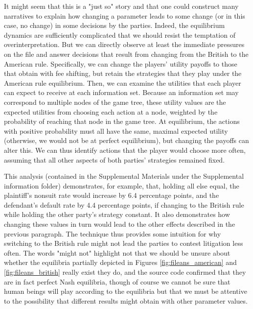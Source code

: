 \documentclass{article}
\begin{document}
It might seem that this is a "just so" story and that one could construct many narratives to explain how changing a parameter leads to some change (or in this case, no change) in some decisions by the parties. Indeed, the equilibrium dynamics are sufficiently complicated that we should resist the temptation of overinterpretation. But  we can directly observe at least the immediate pressures on the file and answer decisions that result from changing from the British to the American rule. Specifically, we can change the players' utility payoffs to those that obtain with fee shifting, but retain the strategies that they play under the American rule equilibrium. Then, we can examine the utilities that each player can expect to receive at each information set. Because an information set may correspond to multiple nodes of the game tree, these utility values are the expected utilities from choosing each action at a node, weighted by the probability of reaching that node in the game tree. At equilibrium, the actions with positive probability must all have the same, maximal expected utility (otherwise, we would not be at perfect equilibrium), but changing the payoffs can alter this. We can thus identify actions that the player would choose more often, assuming that all other aspects of both parties' strategies remained fixed. 

This analysis (contained in the Supplemental Materials under the Supplemental information folder) demonstrates, for example, that, holding all else equal, the plaintiff's nonsuit rate would increase by 6.4 percentage points, and the defendant's default rate by 4.4 percentage points, if changing to the British rule while holding the other party's strategy constant. It also demonstrates how changing these values in turn would lead to the other effects described in the previous paragraph. The technique thus provides some intuition for why switching to the British rule might not lead the parties to contest litigation less often. The words "might not" highlight not that we should be unsure about whether the equilibria partially depicted in Figures \ref{fig:fileans_american} and \ref{fig:fileans_british} really exist \textemdash they do, and the source code confirmed that they are in fact perfect Nash equilibria, though of course we cannot be sure that human beings will play according to the equilibria \textemdash but that we must be attentive to the possibility that different results might obtain with other parameter values. 
\end{document}
